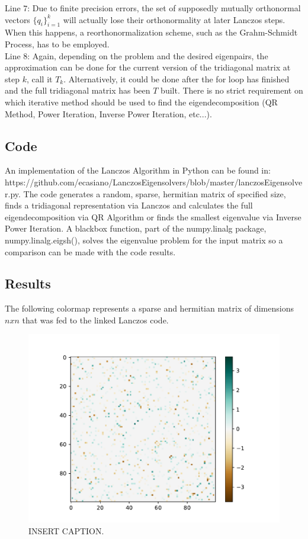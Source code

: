 Line $7$: Due to finite precision errors, the set of supposedly mutually orthonormal vectors $\lbrace q_i \rbrace_{i=1}^{k}$ will actually lose their orthonormality at later Lanczos steps. When this happens, a reorthonormalization scheme, such as the Grahm-Schmidt Process, has to be employed. \\

Line $8$: Again, depending on the problem and the desired eigenpairs, the approximation can be done for the current version of the tridiagonal matrix at step $k$, call it $T_k$. Alternatively, it could be done after the for loop has finished and the full tridiagonal matrix has been $T$ built. There is no strict requirement on which iterative method should be used to find the eigendecomposition (QR Method, Power Iteration, Inverse Power Iteration, etc...). 

\subsection{Code}

An implementation of the Lanczos Algorithm in Python can be found in: https://github.com/ecasiano/LanczosEigensolvers/blob/master/lanczosEigensolver.py. The code generates a random, sparse, hermitian matrix of specified size, finds a tridiagonal representation via Lanczos and calculates the full eigendecomposition via QR Algorithm or finds the smallest eigenvalue via Inverse Power Iteration. A blackbox function, part of the numpy.linalg package, numpy.linalg.eigsh(), solves the eigenvalue problem for the input matrix so a comparison can be made with the code results.

\subsection{Results}

The following colormap represents a sparse and hermitian matrix of dimensions $n x n$ that was fed to the linked Lanczos code. 

\begin{figure}[t]
\begin{center}
\includegraphics[width=0.7\columnwidth]{Images/Lanczos/A.pdf}
\end{center}
\caption{INSERT CAPTION.}
\label{fig:particle_partition}
\end{figure}

